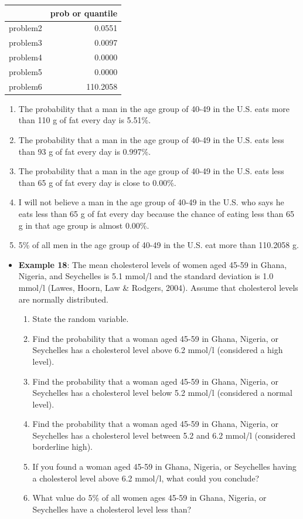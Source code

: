 \documentclass[
]{book}
\providecommand{\tightlist}{%
  \setlength{\itemsep}{0pt}\setlength{\parskip}{0pt}}
\begin{document}
\begin{tabular}{l|r}
\hline
  & prob or quantile\\
\hline
problem2 & 0.0551\\
\hline
problem3 & 0.0097\\
\hline
problem4 & 0.0000\\
\hline
problem5 & 0.0000\\
\hline
problem6 & 110.2058\\
\hline
\end{tabular}

\begin{enumerate}
\def\labelenumi{\arabic{enumi}.}
\setcounter{enumi}{1}
\tightlist
\item
  The probability that a man in the age group of 40-49 in the U.S. eats more than 110 g of fat every day is 5.51\%.
\item
  The probability that a man in the age group of 40-49 in the U.S. eats less than 93 g of fat every day is 0.997\%.
\item
  The probability that a man in the age group of 40-49 in the U.S. eats less than 65 g of fat every day is close to 0.00\%.
\item
  I will not believe a man in the age group of 40-49 in the U.S. who says he eats less than 65 g of fat every day because the chance of eating less than 65 g in that age group is almost 0.00\%.
\item
  5\% of all men in the age group of 40-49 in the U.S. eat more than 110.2058 g.
\end{enumerate}

\begin{itemize}
\item
  \textbf{Example 18}: The mean cholesterol levels of women aged 45-59 in Ghana, Nigeria, and Seychelles is 5.1 mmol/l and the standard deviation is 1.0 mmol/l (Lawes, Hoorn, Law \& Rodgers, 2004). Assume that cholesterol levels are normally distributed.

  \begin{enumerate}
  \def\labelenumi{\arabic{enumi}.}
  \tightlist
  \item
    State the random variable.
  \item
    Find the probability that a woman aged 45-59 in Ghana, Nigeria, or Seychelles has a cholesterol level above 6.2 mmol/l (considered a high level).
  \item
    Find the probability that a woman aged 45-59 in Ghana, Nigeria, or Seychelles has a cholesterol level below 5.2 mmol/l (considered a normal level).
  \item
    Find the probability that a woman aged 45-59 in Ghana, Nigeria, or Seychelles has a cholesterol level between 5.2 and 6.2 mmol/l (considered borderline high).
  \item
    If you found a woman aged 45-59 in Ghana, Nigeria, or Seychelles having a cholesterol level above 6.2 mmol/l, what could you conclude?
  \item
    What value do 5\% of all women ages 45-59 in Ghana, Nigeria, or Seychelles have a cholesterol level less than?
  \end{enumerate}
\end{itemize}
\end{document}
